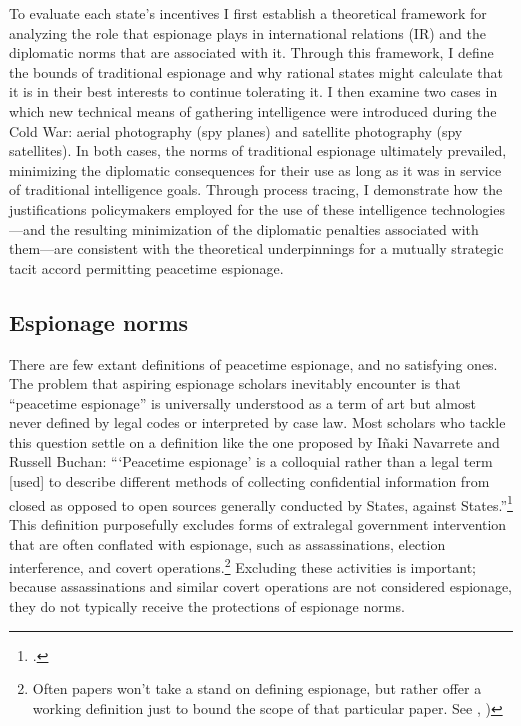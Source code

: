 \documentclass[14pt]{extarticle}
\begin{document}
To evaluate each state's incentives I first establish a theoretical framework for analyzing the role that espionage plays in international relations (IR) and the diplomatic norms that are associated with it. Through this framework, I define the bounds of traditional espionage and why rational states might calculate that it is in their best interests to continue tolerating it. I then examine two cases in which new technical means of gathering intelligence were introduced during the Cold War: aerial photography (spy planes) and satellite photography (spy satellites). In both cases, the norms of traditional espionage ultimately prevailed, minimizing the diplomatic consequences for their use as long as it was in service of traditional intelligence goals. Through process tracing, I demonstrate how the justifications policymakers employed for the use of these intelligence technologies---and the resulting minimization of the diplomatic penalties associated with them---are consistent with the theoretical underpinnings for a mutually strategic tacit accord permitting peacetime espionage.


\subsection{Espionage norms}
There are few extant definitions of peacetime espionage, and no satisfying ones. The problem that aspiring espionage scholars inevitably encounter is that \enquote{peacetime espionage} is universally understood as a term of art but almost never defined by legal codes or interpreted by case law. Most scholars who tackle this question settle on a definition like the one proposed by I\~{n}aki Navarrete and Russell Buchan: \enquote{\enquote{Peacetime espionage} is a colloquial rather than a legal term [used] to describe different methods of collecting confidential information from closed as opposed to open sources \textelp{} generally conducted by States, against States.}\footcite[p.~901-902]{navarrete_out_2019} This definition purposefully excludes forms of extralegal government intervention that are often conflated with espionage, such as assassinations, election interference, and covert operations.\footnote{Often papers won't take a stand on defining espionage, but rather offer a working definition just to bound the scope of that particular paper. See \cite[p.~600]{radsan_unresolved_2007}, \cite[p.~2]{kapp_spying_2007})} Excluding these activities is important; because assassinations and similar covert operations are not considered espionage, they do not typically receive the protections of espionage norms.
\end{document}
